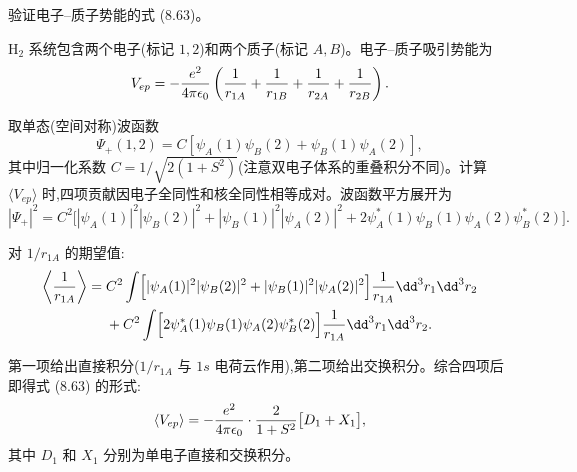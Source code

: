 \begin{question}
验证电子--质子势能的式 (8.63)。

\par\smallskip
{}

\begin{solution}
$\mathrm H_2$ 系统包含两个电子(标记 $1,2$)和两个质子(标记 $A,B$)。电子--质子吸引势能为
\[
V_{ep}=-{e^2\over4\pi\epsilon_0}\left({1\over r_{1A}}+{1\over r_{1B}}+{1\over r_{2A}}+{1\over r_{2B}}\right).
\]

取单态(空间对称)波函数
\[
\Psi_+(1,2)=C[\psi_A(1)\psi_B(2)+\psi_B(1)\psi_A(2)],
\]
其中归一化系数 $C=1/\sqrt{2(1+S^2)}$(注意双电子体系的重叠积分不同)。计算 $\langle V_{ep}\rangle$ 时,四项贡献因电子全同性和核全同性相等成对。波函数平方展开为
\[
|\Psi_+|^2=C^2\bigl[|\psi_A(1)|^2|\psi_B(2)|^2+|\psi_B(1)|^2|\psi_A(2)|^2
+2\psi_A^*(1)\psi_B(1)\psi_A(2)\psi_B^*(2)\bigr].
\]

对 $1/r_{1A}$ 的期望值:
\[
\begin{aligned}\left\langle{1\over r_{1A}}\right\rangle={}&C^2\int\Bigl[|\psi_A(1)|^2|\psi_B(2)|^2+|\psi_B(1)|^2|\psi_A(2)|^2\Bigr]{1\over r_{1A}}\dd^3r_1\dd^3r_2\\&+C^2\int\Bigl[2\psi_A^*(1)\psi_B(1)\psi_A(2)\psi_B^*(2)\Bigr]{1\over r_{1A}}\dd^3r_1\dd^3r_2.\end{aligned}
\]

第一项给出直接积分($1/r_{1A}$ 与 $1s$ 电荷云作用),第二项给出交换积分。综合四项后即得式 (8.63) 的形式:
\[
\langle V_{ep}\rangle=-{e^2\over4\pi\epsilon_0}\cdot{2\over1+S^2}
\bigl[D_1+X_1\bigr],
\]
其中 $D_1$ 和 $X_1$ 分别为单电子直接和交换积分。
\end{solution}
\end{question}

